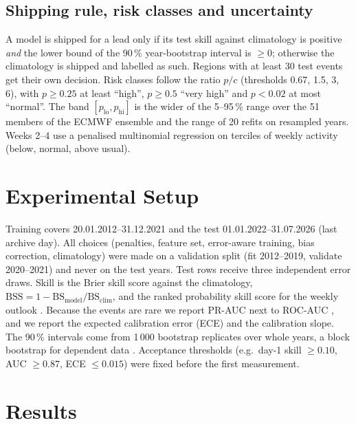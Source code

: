 \documentclass[conference,a4paper]{IEEEtran}
\newcommand{\BSS}{\mathrm{BSS}}
\begin{document}
\subsection{Shipping rule, risk classes and uncertainty}
A model is shipped for a lead only if its test skill against climatology is positive \emph{and} the lower bound of the
90\,\% year-bootstrap interval is $\geq 0$; otherwise the climatology is shipped and labelled as such. Regions with at
least 30 test events get their own decision. Risk classes follow the ratio $p / c$ (thresholds 0.67, 1.5, 3, 6), with
$p \geq 0.25$ at least ``high'', $p \geq 0.5$ ``very high'' and $p < 0.02$ at most ``normal''. The band
$[p_\text{lo}, p_\text{hi}]$ is the wider of the 5--95\,\% range over the 51 members of the ECMWF ensemble and the range
of 20 refits on resampled years. Weeks 2--4 use a penalised multinomial regression on terciles of weekly activity
(below, normal, above usual).

\section{Experimental Setup}

Training covers 20.01.2012--31.12.2021 and the test 01.01.2022--31.07.2026 (last archive day). All choices (penalties,
feature set, error-aware training, bias correction, climatology) were made on a validation split (fit 2012--2019,
validate 2020--2021) and never on the test years. Test rows receive three independent error draws. Skill is the Brier
skill score \cite{brier1950} against the climatology,
$\BSS = 1 - \mathrm{BS}_\text{model} / \mathrm{BS}_\text{clim}$, and the ranked probability skill score for the weekly
outlook \cite{epstein1969,weigel2007}. Because the events are rare we report PR-AUC next to ROC-AUC \cite{saito2015},
and we report the expected calibration error (ECE) \cite{guo2017} and the calibration slope. The 90\,\% intervals come
from 1\,000 bootstrap replicates over whole years, a block bootstrap for dependent data \cite{kunsch1989,roberts2017}.
Acceptance thresholds (e.g.\ day-1 skill $\geq 0.10$, AUC $\geq 0.87$, ECE $\leq 0.015$) were fixed before the first
measurement.

\section{Results}
\end{document}
